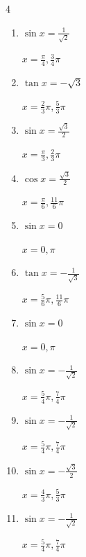 \begin{multicols}{4}
\begin{enumerate}
        $\displaystyle x = \frac{2}{3}\pi , \frac{4}{3}\pi$

  \item $\displaystyle \sin{x}  = \frac{1}{\sqrt{2}}$

        $\displaystyle x = \frac{\pi}{4} , \frac{3}{4}\pi$

  \item $\displaystyle \tan{x}  = -\sqrt{3}$

        $\displaystyle x = \frac{2}{3}\pi , \frac{5}{3}\pi$

  \item $\displaystyle \sin{x}  = \frac{\sqrt{3}}{2}$

        $\displaystyle x = \frac{\pi}{3} , \frac{2}{3}\pi$

  \item $\displaystyle \cos{x}  = \frac{\sqrt{3}}{2}$

        $\displaystyle x = \frac{\pi}{6} , \frac{11}{6}\pi$

  \item $\displaystyle \sin{x}  = 0$

        $\displaystyle x = 0 , \pi$

  \item $\displaystyle \tan{x}  = -\frac{1}{\sqrt{3}}$

        $\displaystyle x = \frac{5}{6}\pi , \frac{11}{6}\pi$

  \item $\displaystyle \sin{x}  = 0$

        $\displaystyle x = 0 , \pi$

  \item $\displaystyle \sin{x}  = -\frac{1}{\sqrt{2}}$

        $\displaystyle x = \frac{5}{4}\pi , \frac{7}{4}\pi$

  \item $\displaystyle \sin{x}  = -\frac{1}{\sqrt{2}}$

        $\displaystyle x = \frac{5}{4}\pi , \frac{7}{4}\pi$

  \item $\displaystyle \sin{x}  = -\frac{\sqrt{3}}{2}$

        $\displaystyle x = \frac{4}{3}\pi , \frac{5}{3}\pi$

  \item $\displaystyle \sin{x}  = -\frac{1}{\sqrt{2}}$

        $\displaystyle x = \frac{5}{4}\pi , \frac{7}{4}\pi$


\end{enumerate}
\end{multicols}
